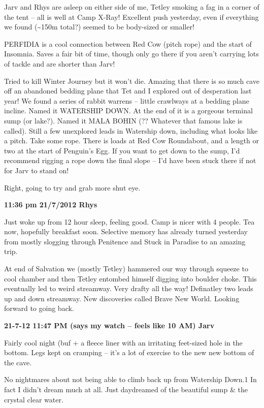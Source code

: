 Jarv and Rhys are asleep on either side of me, Tetley smoking a fag in a
corner of the tent -- all is well at Camp X-Ray! Excellent push
yesterday, even if everything we found (\textasciitilde{}150m total?)
seemed to be body-sized or smaller!

PERFIDIA is a cool connection between Red Cow (pitch rope) and the start
of Insomnia. Saves a fair bit of time, though only go there if you
aren't carrying lots of tackle and are shorter than Jarv!

Tried to kill Winter Journey but it won't die. Amazing that there is so
much cave off an abandoned bedding plane that Tet and I explored out of
desperation last year! We found a series of rabbit warrens -- little
crawlways at a bedding plane incline. Named it WATERSHIP DOWN. At the
end of it is a gorgeous terminal sump (or lake?). Named it MALA BOHIN
(?? Whatever that famous lake is called). Still a few unexplored leads
in Watership down, including what looks like a pitch. Take some rope.
There is loads at Red Cow Roundabout, and a length or two at the start
of Penguin's Egg. If you want to get down to the sump, I'd recommend
rigging a rope down the final slope -- I'd have been stuck there if not
for Jarv to stand on!

Right, going to try and grab more shut eye.

\textbf{11:36 pm 21/7/2012 Rhys}

Just woke up from 12 hour sleep, feeling good. Camp is nicer with 4
people. Tea now, hopefully breakfast soon. Selective memory has already
turned yesterday from mostly slogging through Penitence and Stuck in
Paradise to an amazing trip.

At end of Salvation we (mostly Tetley) hammered our way through squeeze
to cool chamber and then Tetley entombed himself digging into boulder
choke. This eventually led to weird streamway. Very drafty all the way!
Definatley two leads up and down streamway. New discoveries called Brave
New World. Looking forward to going back.

\textbf{21-7-12 11:47 PM (says my watch -- feels like 10 AM) Jarv}

Fairly cool night (buf + a fleece liner with an irritating feet-sized
hole in the bottom. Legs kept on cramping -- it's a lot of exercise to
the new new bottom of the cave.

No nightmares about not being able to climb back up from Watership
Down.1 In fact I didn't dream much at all. Just daydreamed of the
beautiful sump \& the crystal clear water.

